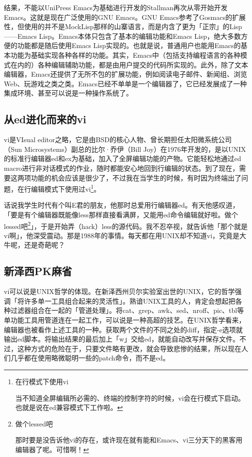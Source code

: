 \documentclass[a4paper,12pt]{article}
\begin{document}
结果，不能以UniPress Emacs为基础进行开发的Stallman再次从零开始开发Emacs。这就是现在广泛使用的GNU Emacs。GNU Emacs参考了Gosmacs的扩展性，但使用的并不是MockLisp那样的山寨语言，而是内含了更为「正宗」的Lisp——Emacs Lisp。Emacs本体只包含了基本的编辑功能和Emacs Lisp，绝大多数方便的功能都是随后使用Emacs Lisp实现的。也就是说，普通用户也能用Emacs的基本功能为基础实现各种各样的功能。其实，Emacs中（包括支持编程语言的各种模式在内的）各种编辑辅助功能，都是由用户提交的代码所实现的。此外，除了文本编辑器，Emacs还提供了无所不包的扩展功能，例如阅读电子邮件、新闻组、浏览Web、玩游戏之类之类。Emacs已经不单单是一个编辑器了，它已经发展成了一种集成环境、甚至可以说是一种操作系统了。

\subsection{从ed进化而来的vi}

vi是VIsual editor之略，它是由BSD的核心人物、曾长期担任太阳微系统公司（Sun Microsystems）副总的比尔·乔伊（Bill Joy）在1976年开发的，是以UNIX的标准行编辑器ed和ex为基础，加入了全屏编辑功能的产物。它能轻松地通过ed macro进行非对话模式的作业，随时都能安心地回到行编辑的状态。到了现在，需要这两项功能的机会应该是很少了，不过我在当学生的时候，有时因为终端出了问题，在行编辑模式下使用过vi\footnote{在行模式下使用vi

当不知道全屏编辑所必需的、终端的控制字符的时候，vi会在行模式下启动。也就是说在ed兼容模式下工作啦。}。

话说我学生时代有个叫E君的朋友，他那时总爱用行编辑器ed。有天他感叹道，「要是有个编辑器既能像less那样直接看满屏，又能用ed命令编辑就好啦。做个lessed吧\footnote{做个lessed吧

那时要是没告诉他vi的存在，或许现在就有能和Emacs、vi三分天下的黑客用编辑器了呢。可惜啊！}」，于是开始弄（hack）less的源代码。我不忍卒视，就告诉他「那个就是vi啊」，他深受震动。那是1988年的事情。每天都在用UNIX却不知道vi，究竟是大牛呢，还是奇葩呢？

\subsection{新泽西PK麻省}

vi可以说是UNIX哲学的体现。在新泽西州贝尔实验室出世的UNIX，它的哲学强调「将许多单一工具组合起来的灵活性」。熟谙UNIX工具的人，肯定会想起把各种过滤器组合在一起的「管道处理」。将cat、grep、awk、sed、nroff、pic、tbl等单功能工具用管道连在一起工作，可以说是一种高超的技艺。在UNIX哲学看来，编辑器也被看作上述工具的一种。获取两个文件的不同之处的diff，指定-e选项就输出ed脚本。将输出结果的最后加上「w」交给ed，就能自动改写并保存文件。不过，这种方式的危险在于，只要文件略有更改，就会导致悲惨的结果，所以现在人们几乎都在使用略微聪明一些的patch命令，而不是ed。
\end{document}
